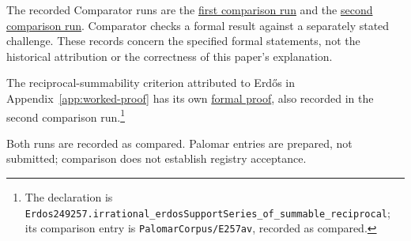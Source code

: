 \documentclass[10pt]{article}
\newcommand{\repobase}{https://github.com/wcook04/plectis-erdos}
\begin{document}
The recorded Comparator runs are the \href{https://github.com/wcook04/plectis-erdos-lean/actions/runs/35544127144}{first comparison run} and the \href{https://github.com/wcook04/plectis-erdos-lean/actions/runs/35624228171}{second comparison run}. Comparator checks a formal result against a separately stated challenge. These records concern the specified formal statements, not the historical attribution or the correctness of this paper's explanation.

The reciprocal-summability criterion attributed to Erd\H{o}s in Appendix~\ref{app:worked-proof} has its own \href{\repobase/blob/7308896010e6b527d283dfdd0687a717a6183fb6/lean/Erdos249257/AllBaseReciprocalSupportIrrationality.lean}{formal proof}, also recorded in the second comparison run.\footnote{The declaration is \nolinkurl{Erdos249257.irrational_erdosSupportSeries_of_summable_reciprocal}; its comparison entry is \texttt{PalomarCorpus/E257av}, recorded as compared.}

Both runs are recorded as compared. Palomar entries are prepared, not submitted; comparison does not establish registry acceptance.
\end{document}
